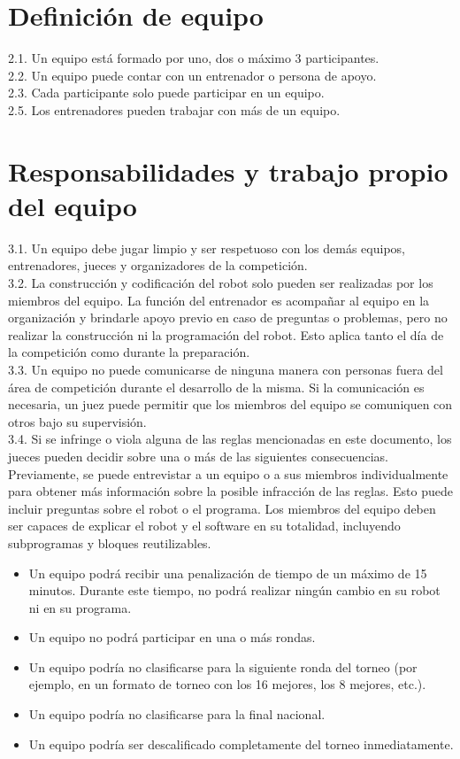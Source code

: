 \documentclass[12pt,a4paper]{article}
\begin{document}
\section{Definición de equipo}
2.1. Un equipo está formado por uno, dos o máximo 3 participantes. \\
2.2. Un equipo puede contar con un entrenador o persona de apoyo. \\
2.3. Cada participante solo puede participar en un equipo. \\
2.5. Los entrenadores pueden trabajar con más de un equipo.

\section{Responsabilidades y trabajo propio del equipo}
3.1. Un equipo debe jugar limpio y ser respetuoso con los demás equipos, entrenadores, jueces y organizadores de la competición. \\
3.2. La construcción y codificación del robot solo pueden ser realizadas por los miembros del equipo. La función del entrenador es acompañar al equipo en la organización y brindarle apoyo previo en caso de preguntas o problemas, pero no realizar la construcción ni la programación del robot. Esto aplica tanto el día de la competición como durante la preparación. \\
3.3. Un equipo no puede comunicarse de ninguna manera con personas fuera del área de competición durante el desarrollo de la misma. Si la comunicación es necesaria, un juez puede permitir que los miembros del equipo se comuniquen con otros bajo su supervisión. \\
3.4. Si se infringe o viola alguna de las reglas mencionadas en este documento, los jueces pueden decidir sobre una o más de las siguientes consecuencias. Previamente, se puede entrevistar a un equipo o a sus miembros individualmente para obtener más información sobre la posible infracción de las reglas. Esto puede incluir preguntas sobre el robot o el programa. Los miembros del equipo deben ser capaces de explicar el robot y el software en su totalidad, incluyendo subprogramas y bloques reutilizables.
\begin{itemize}
    \item[3.4.1.] Un equipo podrá recibir una penalización de tiempo de un máximo de 15 minutos. Durante este tiempo, no podrá realizar ningún cambio en su robot ni en su programa.
    \item[3.4.2.] Un equipo no podrá participar en una o más rondas.
    \item[3.4.3.] Un equipo podría no clasificarse para la siguiente ronda del torneo (por ejemplo, en un formato de torneo con los 16 mejores, los 8 mejores, etc.).
    \item[3.4.4.] Un equipo podría no clasificarse para la final nacional.
    \item[3.4.5.] Un equipo podría ser descalificado completamente del torneo inmediatamente.
\end{itemize}
\end{document}
